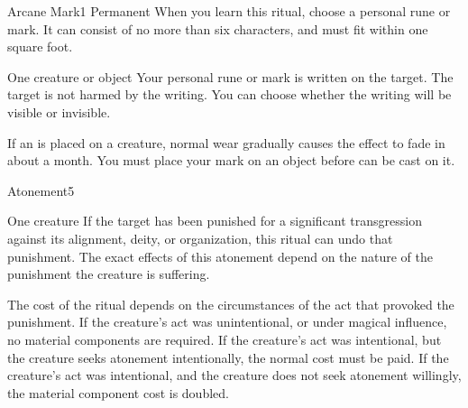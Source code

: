 \begin{spellsection}{Arcane Mark}{1}
\spellrng{\rngtouch}
\spelldur Permanent
\spellspecial When you learn this ritual, choose a personal rune or mark. It can consist of no more than six characters, and must fit within one square foot.
\begin{spelltarget}{One creature or object}
    \spelleffect Your personal rune or mark is written on the target. The target is not harmed by the writing. You can choose whether the writing will be visible or invisible.
\end{spelltarget}
\spellnotes If an  is placed on a creature, normal wear gradually causes the effect to fade in about a month. You must place your mark on an object before  can be cast on it.
\end{spellsection}

\begin{spellsection}{Atonement}{5}
\begin{spelltarget}{One creature}
    \spelleffect If the target has been punished for a significant transgression against its alignment, deity, or organization, this ritual can undo that punishment. The exact effects of this atonement depend on the nature of the punishment the creature is suffering.

    The cost of the ritual depends on the circumstances of the act that provoked the punishment. If the creature's act was unintentional, or under magical influence, no material components are required. If the creature's act was intentional, but the creature seeks atonement intentionally, the normal cost must be paid. If the creature's act was intentional, and the creature does not seek atonement willingly, the material component cost is doubled.
\end{spelltarget}
\end{spellsection}

